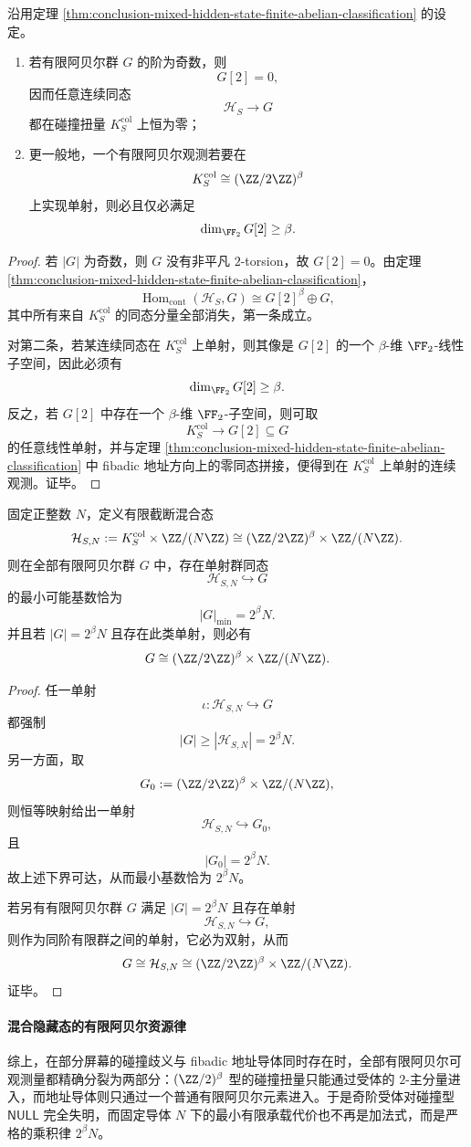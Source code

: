 \begin{corollary}\label{cor:conclusion-mixed-hidden-state-odd-order-blindness}
沿用定理 \ref{thm:conclusion-mixed-hidden-state-finite-abelian-classification} 的设定。
\begin{enumerate}
  \item 若有限阿贝尔群 \(G\) 的阶为奇数，则
  \[
  G[2]=0,
  \]
  因而任意连续同态
  \[
  \mathcal H_S\to G
  \]
  都在碰撞扭量 \(K_S^{\mathrm{col}}\) 上恒为零；
  \item 更一般地，一个有限阿贝尔观测若要在
  \[
  K_S^{\mathrm{col}}\cong (\ZZ/2\ZZ)^\beta
  \]
  上实现单射，则必且仅必满足
  \[
  \dim_{\FF_2}G[2]\ge \beta.
  \]
\end{enumerate}
\end{corollary}
\begin{proof}
若 \(|G|\) 为奇数，则 \(G\) 没有非平凡 \(2\)-torsion，故 \(G[2]=0\)。由定理 \ref{thm:conclusion-mixed-hidden-state-finite-abelian-classification}，
\[
\operatorname{Hom}_{\mathrm{cont}}(\mathcal H_S,G)\cong G[2]^\beta\oplus G,
\]
其中所有来自 \(K_S^{\mathrm{col}}\) 的同态分量全部消失，第一条成立。

对第二条，若某连续同态在 \(K_S^{\mathrm{col}}\) 上单射，则其像是 \(G[2]\) 的一个 \(\beta\)-维 \(\FF_2\)-线性子空间，因此必须有
\[
\dim_{\FF_2}G[2]\ge \beta.
\]
反之，若 \(G[2]\) 中存在一个 \(\beta\)-维 \(\FF_2\)-子空间，则可取
\[
K_S^{\mathrm{col}}\to G[2]\subseteq G
\]
的任意线性单射，并与定理 \ref{thm:conclusion-mixed-hidden-state-finite-abelian-classification} 中 fibadic 地址方向上的零同态拼接，便得到在 \(K_S^{\mathrm{col}}\) 上单射的连续观测。证毕。
\end{proof}

\begin{theorem}[固定导体下混合隐藏态的最小有限受体]\label{thm:conclusion-mixed-hidden-state-minimal-finite-receiver}
固定正整数 \(N\)，定义有限截断混合态
\[
\mathcal H_{S,N}:=K_S^{\mathrm{col}}\times \ZZ/(N\ZZ)
\cong
(\ZZ/2\ZZ)^\beta\times \ZZ/(N\ZZ).
\]
则在全部有限阿贝尔群 \(G\) 中，存在单射群同态
\[
\mathcal H_{S,N}\hookrightarrow G
\]
的最小可能基数恰为
\[
|G|_{\min}=2^\beta N.
\]
并且若 \(|G|=2^\beta N\) 且存在此类单射，则必有
\[
G\cong (\ZZ/2\ZZ)^\beta\times \ZZ/(N\ZZ).
\]
\end{theorem}
\begin{proof}
任一单射
\[
\iota:\mathcal H_{S,N}\hookrightarrow G
\]
都强制
\[
|G|\ge |\mathcal H_{S,N}|=2^\beta N.
\]
另一方面，取
\[
G_0:=(\ZZ/2\ZZ)^\beta\times \ZZ/(N\ZZ),
\]
则恒等映射给出一单射
\[
\mathcal H_{S,N}\hookrightarrow G_0,
\]
且
\[
|G_0|=2^\beta N.
\]
故上述下界可达，从而最小基数恰为 \(2^\beta N\)。

若另有有限阿贝尔群 \(G\) 满足 \(|G|=2^\beta N\) 且存在单射
\[
\mathcal H_{S,N}\hookrightarrow G,
\]
则作为同阶有限群之间的单射，它必为双射，从而
\[
G\cong \mathcal H_{S,N}\cong (\ZZ/2\ZZ)^\beta\times \ZZ/(N\ZZ).
\]
证毕。
\end{proof}

\paragraph{混合隐藏态的有限阿贝尔资源律}
综上，在部分屏幕的碰撞歧义与 fibadic 地址导体同时存在时，全部有限阿贝尔可观测量都精确分裂为两部分：\((\ZZ/2)^\beta\) 型的碰撞扭量只能通过受体的 \(2\)-主分量进入，而地址导体则只通过一个普通有限阿贝尔元素进入。于是奇阶受体对碰撞型 \(\mathsf{NULL}\) 完全失明，而固定导体 \(N\) 下的最小有限承载代价也不再是加法式，而是严格的乘积律 \(2^\beta N\)。

\endinput
